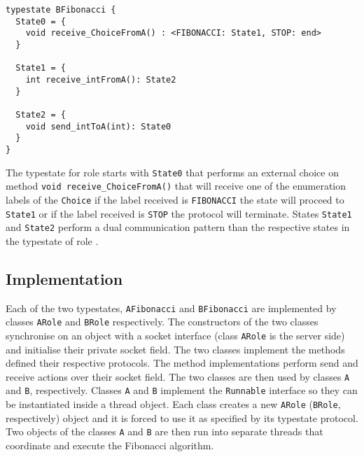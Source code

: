 \begin{lstlisting}[caption={Typestate for Role \B}]
typestate BFibonacci {
  State0 = {
    void receive_ChoiceFromA() : <FIBONACCI: State1, STOP: end>
  }

  State1 = {
    int receive_intFromA(): State2
  }

  State2 = {
    void send_intToA(int): State0
  }
}
\end{lstlisting}

The typestate for role \B starts with \lstinline|State0|
that performs an external choice on method
\lstinline|void receive_ChoiceFromA()| that will receive
one of the enumeration labels of the \lstinline|Choice|
if the label received is \lstinline|FIBONACCI| the state
will proceed to \lstinline|State1| or if the label
received is \lstinline|STOP| the protocol will terminate.
States \lstinline|State1| and \lstinline|State2| perform
a dual communication pattern than the respective states
in the typestate of role \A.


\subsection{\Mungo Implementation}

Each of the two typestates, \lstinline|AFibonacci| and
\lstinline|BFibonacci| are implemented by classes
\lstinline|ARole| and \lstinline|BRole| respectively.
The constructors of the two classes synchronise
on an object with a socket interface (class \lstinline|ARole|
is the server side) and initialise their private socket
field.
The two classes implement
the methods defined their respective protocols. The
method implementations perform send and receive actions
over their socket field. The two classes are then
used by classes \lstinline|A| and \lstinline|B|, respectively.
Classes \lstinline|A| and \lstinline|B| implement the \lstinline|Runnable|
interface so they can be instantiated inside a thread object.
Each class creates a new \lstinline|ARole| (\lstinline|BRole|, respectively)
object and it is forced to use it as specified by its typestate
protocol.
Two objects of the classes \lstinline|A| and \lstinline|B| are
then run into separate threads that coordinate and execute the
Fibonacci algorithm.

\begin{comment}
We could refine the automated code to be more readable:
\begin{lstlisting}
typestate AFibonacci {
  Fibonacci = {
    void send_fibonacciToB() : PingPong,
    void send_stopToB() : end,
  }

  PingPong	=	{
    void send_intToB(int): { 
      int receive_intFromB(): Fibonacci
    }
  }
}
\end{lstlisting}

\begin{lstlisting}
typestate BFibonacci {
  Fibonacci = {
    void receive_ChoiceFromA() : <FIBONACCI: PingPong, STOP: end>
  }

  PingPong = {
    int receive_intFromA(): {
      void send_intToA(int): State0
    }
  }
}
\end{lstlisting}
\end{comment}

